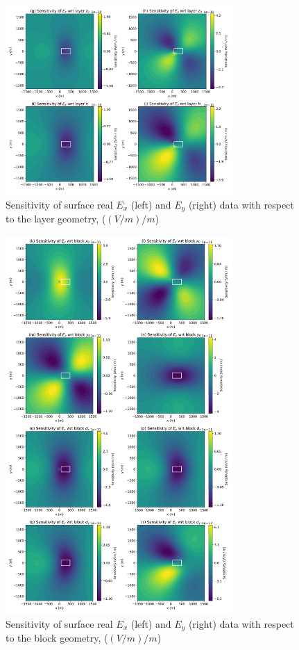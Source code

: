 {%
\begin{figure}[htb!]
    \centering
    \includegraphics[width=0.77\textwidth]{images/J_layer.png}
\caption{Sensitivity of surface real $E_x$ (left) and $E_y$ (right) data with respect to the layer geometry, ($(V /m) / m$)}
\label{fig:J_layer}
\end{figure}
}

{%
\begin{figure}[htb!]
    \centering
    \includegraphics[width=0.77\textwidth]{images/J_block.png}
\caption{Sensitivity of surface real $E_x$ (left) and $E_y$ (right) data with respect to the block geometry, ($(V /m) / m$)}
\label{fig:J_block}
\end{figure}
}

